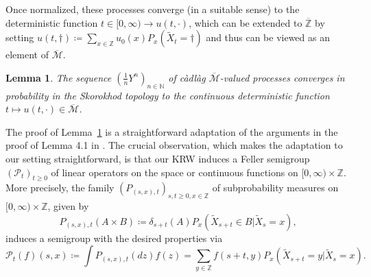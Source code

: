\documentclass[12pt,reqno,oneside]{amsart}
\numberwithin{equation}{section}
\newtheorem{lemma}[theorem]{Lemma}
\theoremstyle{definition}
\theoremstyle{remark}
\newcommand{\N}{\mathbb{N}}
\newcommand{\Z}{\mathbb{Z}}
\newcommand{\OZ}{\overline{\mathbb{Z}}}
\begin{document}
Once normalized, these processes converge (in a suitable sense) to the
deterministic function $t \in [0,\infty) \rightarrow u(t, \cdot)$, which can
be extended to $\OZ$ by setting
$u(t,\dagger)\coloneq\sum_{x \in \Z} u_0(x) P_x(\tilde{X}_t = \dagger)$ and thus
can be viewed as an element of $ \overline{\mathcal{M}}$.

\begin{lemma}
  \label{lemma:TildeYn}
  The sequence $(\frac{1}{n}Y^n)_{n \in \N}$ of càdlàg
  $\overline{\mathcal{M}}$-valued processes converges in probability in the
  Skorokhod topology to the continuous deterministic function
  $t \mapsto u(t,\cdot) \in \overline{\mathcal{M}}$.
\end{lemma}

The proof of Lemma~\ref{lemma:TildeYn} is a straightforward adaptation of the
arguments in the proof of Lemma 4.1 in \cite{EW99}. The crucial observation,
which makes the adaptation to our setting straightforward, is that our KRW
induces a Feller semigroup $(\mathcal{P}_t)_{t \geq 0}$ of linear operators
on the space or continuous functions on $[0,\infty)\times \Z$. More
precisely, the family $(P_{(s,x),t})_{s,t\geq0, x \in \Z}$ of subprobability
measures on $[0,\infty)\times \Z$, given by
\begin{equation*}
  P_{(s,x),t}(A \times B)
  \coloneq\delta_{s+t}(A) P_x(\tilde{X}_{s+t} \in B | \tilde{X}_s=x),
\end{equation*}
induces a semigroup with the desired properties via
\begin{equation*}
  \mathcal{P}_t(f)(s,x)\coloneq\int P_{(s,x),t}(dz) f(z)
  = \sum_{y \in \Z} f(s+t,y) P_x(\tilde{X}_{s+t} = y | \tilde{X}_s =x).
\end{equation*}
\end{document}
